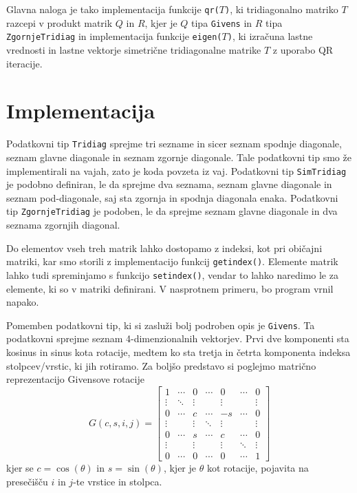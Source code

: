 \documentclass[11pt, titlepage]{article}
\begin{document}
Glavna naloga je tako implementacija funkcije \texttt{qr($T$)}, ki tridiagonalno matriko $T$ razcepi v produkt matrik $Q$ in $R$, kjer je $Q$ tipa \texttt{Givens} in $R$ tipa \texttt{ZgornjeTridiag} in
implementacija funkcije \texttt{eigen($T$)}, ki izračuna lastne vrednosti in lastne vektorje simetrične tridiagonalne matrike $T$ z uporabo QR iteracije.

\section{Implementacija}
Podatkovni tip \texttt{Tridiag} sprejme tri sezname in sicer seznam spodnje diagonale, seznam glavne diagonale in seznam zgornje diagonale.
Tale podatkovni tip smo že implementirali na vajah, zato je koda povzeta iz vaj. Podatkovni tip \texttt{SimTridiag} je podobno definiran, le da sprejme dva seznama, seznam glavne diagonale in seznam pod-diagonale, 
saj sta zgornja in spodnja diagonala enaka. Podatkovni tip \texttt{ZgornjeTridiag} je podoben, le da sprejme seznam glavne diagonale in dva seznama zgornjih diagonal.

Do elementov vseh treh matrik lahko dostopamo z indeksi, kot pri običajni matriki, kar smo storili z implementacijo funkcij \texttt{getindex()}. Elemente matrik lahko tudi spreminjamo s funkcijo \texttt{setindex()},
vendar to lahko naredimo le za elemente, ki so v matriki definirani. V nasprotnem primeru, bo program vrnil napako.

Pomemben podatkovni tip, ki si zasluži bolj podroben opis je \texttt{Givens}. Ta podatkovni sprejme seznam 4-dimenzionalnih vektorjev. Prvi dve komponenti sta kosinus in sinus kota rotacije, medtem ko sta tretja in četrta komponenta
indeksa stolpcev/vrstic, ki jih rotiramo. Za boljšo predstavo si poglejmo matrično reprezentacijo Givensove rotacije
\[
G(c,s,i,j) =
\begin{bmatrix}
1      & \cdots & 0      & \cdots & 0      & \cdots & 0      \\
\vdots & \ddots & \vdots &        & \vdots &        & \vdots \\
0      & \cdots & c      & \cdots & -s     & \cdots & 0      \\
\vdots &        & \vdots & \ddots & \vdots &        & \vdots \\
0      & \cdots & s      & \cdots & c      & \cdots & 0      \\
\vdots &        & \vdots &        & \vdots & \ddots & \vdots \\
0      & \cdots & 0      & \cdots & 0      & \cdots & 1      
\end{bmatrix}
\]
kjer se $c = \cos(\theta)$ in $s = \sin(\theta)$, kjer je $\theta$ kot rotacije, pojavita na presečišču $i$ in $j$-te vrstice in stolpca.
\end{document}
